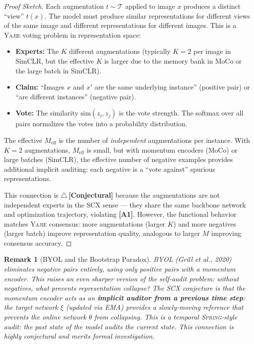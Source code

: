 \documentclass[12pt,a4paper]{article}
\newtheorem{remark}[theorem]{Remark}
\theoremstyle{definition}
\newcommand{\rigorConjectural}{{\color{red!70!black}$\triangle$\,\textbf{[Conjectural]}}}
\newcommand{\Yajie}{\textsc{Yajie}}
\newcommand{\Spring}{\textsc{Spring}}
\newcommand{\SCX}{\textsc{SCX}}
\newcommand{\cT}{\mathcal{T}}
\newcommand{\asmTag}[1]{\textsf{\textbf{[A#1]}}}
\begin{document}
\begin{proof}[Proof Sketch]
Each augmentation $t \sim \cT$ applied to image $x$ produces a distinct ``view'' $t(x)$. The model must produce similar representations for different views of the same image and different representations for different images. This is a \Yajie{} voting problem in representation space:

\begin{itemize}[nosep]
    \item \textbf{Experts:} The $K$ different augmentations (typically $K=2$ per image in SimCLR, but the effective $K$ is larger due to the memory bank in MoCo or the large batch in SimCLR).
    \item \textbf{Claim:} ``Images $x$ and $x'$ are the same underlying instance'' (positive pair) or ``are different instances'' (negative pair).
    \item \textbf{Vote:} The similarity $\text{sim}(z_i, z_j)$ is the vote strength. The softmax over all pairs normalizes the votes into a probability distribution.
\end{itemize}

The effective $M_{\text{eff}}$ is the number of \emph{independent} augmentations per instance. With $K=2$ augmentations, $M_{\text{eff}}$ is small, but with momentum encoders (MoCo) or large batches (SimCLR), the effective number of negative examples provides additional implicit auditing: each negative is a ``vote against'' spurious representations.

This connection is \rigorConjectural{} because the augmentations are not independent experts in the \SCX{} sense — they share the same backbone network and optimization trajectory, violating \asmTag{1}. However, the functional behavior matches \Yajie{} consensus: more augmentations (larger $K$) and more negatives (larger batch) improve representation quality, analogous to larger $M$ improving consensus accuracy.
\end{proof}

\begin{remark}[BYOL and the Bootstrap Paradox]
BYOL (Grill et al., 2020) eliminates negative pairs entirely, using only positive pairs with a momentum encoder. This raises an even sharper version of the self-audit problem: without negatives, what prevents representation collapse? The \SCX{} conjecture is that the momentum encoder acts as an \textbf{implicit auditor from a previous time step}: the target network $\xi$ (updated via EMA) provides a slowly-moving reference that prevents the online network $\theta$ from collapsing. This is a temporal \Spring{}-style audit: the past state of the model audits the current state. This connection is highly conjectural and merits formal investigation.
\end{remark}
\end{document}
